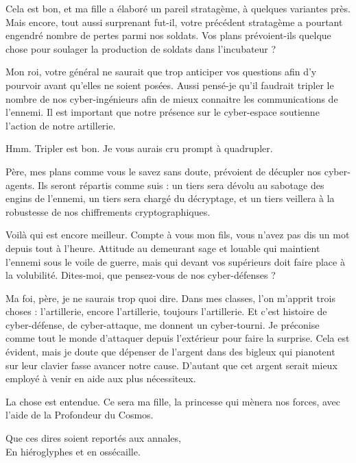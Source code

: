 \begin{drama}
  \roispeaks Cela est bon, et ma fille a élaboré un pareil stratagème, à quelques variantes près. Mais encore, tout aussi surprenant fut-il, votre précédent stratagème a pourtant engendré nombre de pertes parmi nos soldats. Vos plans prévoient-ils quelque chose pour soulager la production de soldats dans l’incubateur ?

  \generalspeaks Mon roi, votre général ne saurait que trop anticiper vos questions afin d’y pourvoir avant qu’elles ne soient posées. Aussi pensé-je qu’il faudrait tripler le nombre de nos cyber-ingénieurs afin de mieux connaitre les communications de l’ennemi. Il est important que notre présence sur le cyber-espace soutienne l’action de notre artillerie.

  \roispeaks Hmm. Tripler est bon. Je vous aurais cru prompt à quadrupler.

  \princessespeaks Père, mes plans comme vous le savez sans doute, prévoient de décupler nos cyber-agents. Ils seront répartis comme suis : un tiers sera dévolu au sabotage des engins de l’ennemi, un tiers sera chargé du décryptage, et un tiers veillera à la robustesse de nos chiffrements cryptographiques.


  \roispeaks Voilà qui est encore meilleur. Compte à vous mon fils, vous n’avez pas dis un mot depuis tout à l’heure. Attitude au demeurant sage et louable qui maintient l’ennemi sous le voile de guerre, mais qui devant vos supérieurs doit faire place à la volubilité. Dites-moi, que pensez-vous de nos cyber-défenses ?

  \elenaspeaks Ma foi, père, je ne saurais trop quoi dire. Dans mes classes, l’on m’apprit trois choses : l’artillerie, encore l’artillerie, toujours l’artillerie. Et c’est histoire de cyber-défense, de cyber-attaque, me donnent un cyber-tourni. Je préconise comme tout le monde d’attaquer depuis l’extérieur pour faire la surprise. Cela est évident, mais je doute que dépenser de l’argent dans des bigleux qui pianotent sur leur clavier fasse avancer notre cause. D’autant que cet argent serait mieux employé à venir en aide aux plus nécessiteux.

  \roispeaks La chose est entendue. Ce sera ma fille, la princesse \princesse{} qui mènera nos forces, avec l’aide de la Profondeur du Cosmos.

  \begin{minipage}[t]{\linewidth}
    Que ces dires soient reportés aux annales,\\
    En hiéroglyphes et en ossécaille.
  \end{minipage}


\end{drama}

